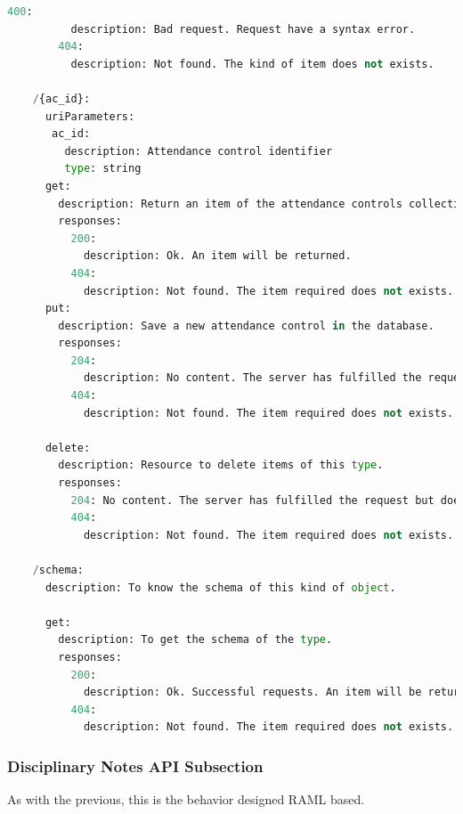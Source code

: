 \begin{lstlisting}[language=python,frame=none]
        400:
          description: Bad request. Request have a syntax error.
        404:
          description: Not found. The kind of item does not exists.

    /{ac_id}:
      uriParameters:
       ac_id:
         description: Attendance control identifier
         type: string
      get:
        description: Return an item of the attendance controls collection.
        responses:
          200:
            description: Ok. An item will be returned.
          404:
            description: Not found. The item required does not exists.
      put:
        description: Save a new attendance control in the database.
        responses:
          204:
            description: No content. The server has fulfilled the request but does not need to return an entity-body.
          404:
            description: Not found. The item required does not exists.

      delete:
        description: Resource to delete items of this type.
        responses:
          204: No content. The server has fulfilled the request but does not need to return an entity-body.
          404:
            description: Not found. The item required does not exists.

    /schema:
      description: To know the schema of this kind of object.

      get:
        description: To get the schema of the type.
        responses:
          200:
            description: Ok. Successful requests. An item will be returned.
          404:
            description: Not found. The item required does not exists.

\end{lstlisting}

\subsubsection{Disciplinary Notes API Subsection}

As with the previous, this is the behavior designed RAML based.

